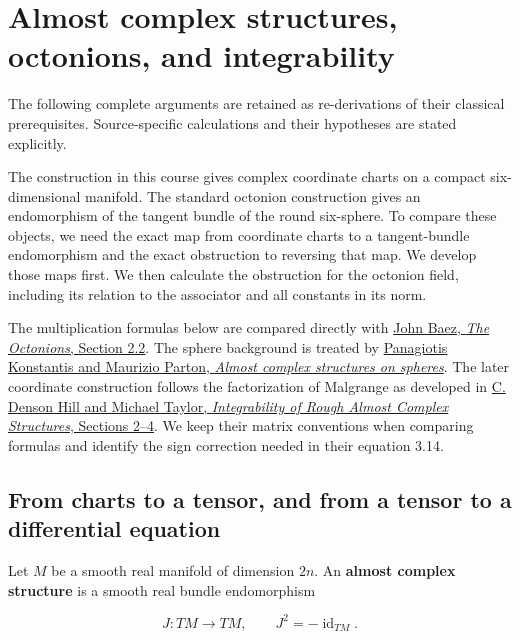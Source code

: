 \section{Almost complex structures, octonions, and integrability}\label{courseIII:almost-complex-structures-and-integrability:section}

The following complete arguments are retained as re-derivations of their classical prerequisites. Source-specific calculations and their hypotheses are stated explicitly.

The construction in this course gives complex coordinate charts on a compact six-dimensional manifold. The standard octonion construction gives an endomorphism of the tangent bundle of the round six-sphere. To compare these objects, we need the exact map from coordinate charts to a tangent-bundle endomorphism and the exact obstruction to reversing that map. We develop those maps first. We then calculate the obstruction for the octonion field, including its relation to the associator and all constants in its norm.

The multiplication formulas below are compared directly with \href{https://arxiv.org/abs/math/0105155v4}{John Baez, \emph{The Octonions}, Section 2.2}. The sphere background is treated by \href{https://arxiv.org/abs/1707.03883v1}{Panagiotis Konstantis and Maurizio Parton, \emph{Almost complex structures on spheres}}. The later coordinate construction follows the factorization of Malgrange as developed in \href{https://arxiv.org/abs/0710.2310v2}{C. Denson Hill and Michael Taylor, \emph{Integrability of Rough Almost Complex Structures}, Sections 2--4}. We keep their matrix conventions when comparing formulas and identify the sign correction needed in their equation 3.14.

\subsection{From charts to a tensor, and from a tensor to a differential equation}
\label{courseIII:almost-complex-structures-and-integrability:charts-and-tensors}

\label{courseIII:almost-complex-structures-and-integrability:section-1}

Let \(M\) be a smooth real manifold of dimension \(2n\). An \textbf{almost complex structure} is a smooth real bundle endomorphism

\begin{equation}
J:TM\longrightarrow TM,\qquad J^2=-\operatorname{id}_{TM}.
\label{courseIII:almost-complex-structures-and-integrability:eq:1.1}
\end{equation}

